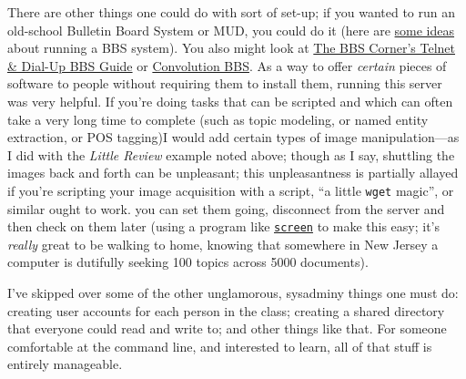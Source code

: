 \documentclass[
  12pt,
]{article}
\begin{document}
There are other things one could do with sort of set-up; if you wanted
to run an old-school Bulletin Board System or MUD, you could do it (here
are \href{http://lunduke.com/?p=2156}{some ideas} about running a BBS
system). {You also might look at
\href{http://www.telnetbbsguide.com/ssh.htm}{The BBS Corner's Telnet \&
Dial-Up BBS Guide} or \href{http://www.convolution.us/}{Convolution
BBS}.} As a way to offer \emph{certain} pieces of software to people
without requiring them to install them, running this server was very
helpful. If you're doing tasks that can be scripted and which can often
take a very long time to complete (such as topic modeling, or named
entity extraction, or POS tagging){I would add certain types of image
manipulation---as I did with the \emph{Little Review} example noted
above; though as I say, shuttling the images back and forth can be
unpleasant; this unpleasantness is partially allayed if you're scripting
your image acquisition with a script, ``a little \texttt{wget} magic'',
or similar ought to work.} you can set them going, disconnect from the
server and then check on them later (using a program like
\href{http://www.gnu.org/software/screen/}{\texttt{screen}} to make this
easy; it's \emph{really} great to be walking to home, knowing that
somewhere in New Jersey a computer is dutifully seeking 100 topics
across 5000 documents).

I've skipped over some of the other unglamorous, sysadminy things one
must do: creating user accounts for each person in the class; creating a
shared directory that everyone could read and write to; and other things
like that. For someone comfortable at the command line, and interested
to learn, all of that stuff is entirely manageable.
\end{document}
